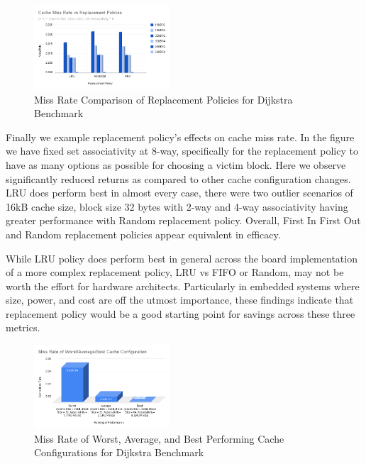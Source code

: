 \documentclass[conference]{IEEEtran}
\begin{document}
\begin{figure}[H]
  \centering
  \includegraphics[width=0.45\textwidth]{dijkstraFigures/CacheMissRatevsReplacementPolicies.png}
  \caption{Miss Rate Comparison of Replacement Policies for Dijkstra Benchmark}
  \label{fig:MissRateVsReplPolicy}
\end{figure}

Finally we example replacement policy's effects on cache miss rate. In the figure we have fixed set associativity at 8-way, specifically for the replacement policy to have as many options as possible for choosing a victim block. Here we observe significantly reduced returns as compared to other cache configuration changes. LRU does perform best in almost every case, there were two outlier scenarios of 16kB cache size, block size 32 bytes with 2-way and 4-way associativity having greater performance with Random replacement policy. Overall, First In First Out and Random replacement policies appear equivalent in efficacy. 

While LRU policy does perform best in general across the board implementation of a more complex replacement policy, LRU vs FIFO or Random, may not be worth the effort for hardware architects. Particularly in embedded systems where size, power, and cost are off the utmost importance, these findings indicate that replacement policy would be a good starting point for savings across these three metrics.

\begin{figure}[H]
  \centering
  \includegraphics[width=0.45\textwidth]{dijkstraFigures/MissRateofWorstAverageBestCacheConfiguration.png}
  \caption{Miss Rate of Worst, Average, and Best Performing Cache Configurations for Dijkstra Benchmark}
  \label{fig:WorstAvgBest}
\end{figure}
\end{document}
